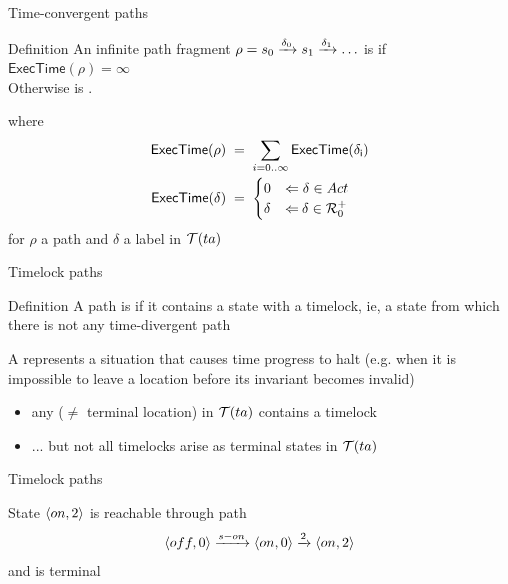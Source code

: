 \documentclass[aspectratio=169]{beamer}
\begin{document}
\def\ET#1{\mathsf{ExecTime(#1)}}
\begin{slide}{Time-convergent paths}
\small

\begin{block}{Definition}
An infinite path fragment $\rho = s_0 \xrightarrow{\delta_0} s_1 \xrightarrow{\delta_1} \ldots$ is  if $\ET{\rho} = \infty$\\
Otherwise is  . 
\end{block}

where
\begin{align*}
\ET{\rho}\; & =\; \sum_{i=0 .. \infty} \ET{\delta_i}\\
\ET{\delta}\; & =\; \begin{cases}
0 & \rimp\;  \delta \in Act\\
\delta & \rimp\:  \delta \in \R_0^+
\end{cases}
\end{align*}
for $\rho$ a path and $\delta$ a label in $\mathcal{T}(ta)$ 
\end{slide}

\begin{slide}{Timelock paths}
\small

\begin{block}{Definition}
A path is  if it contains a state with a timelock, ie, a \alert{state
from which there is not any time-divergent path}
\vspace{0.3cm}

A  represents a situation that causes time progress to halt (e.g. when it is impossible to leave a location before its invariant becomes invalid)
\end{block}

\begin{itemize}
\item any  ($\neq$ terminal location) in $\mathcal{T}(ta)$ contains a timelock
\item ... but not all timelocks arise as terminal states in $\mathcal{T}(ta)$
\end{itemize}
\end{slide}



\begin{slide}{Timelock paths}
\small

\begin{center}
\end{center}

State $\langle on,2 \rangle$ \pause is reachable through path 
$$\langle off,0 \rangle \xrightarrow{s-on} \langle on,0 \rangle \xrightarrow{2} \langle on,2 \rangle$$
and is terminal

\end{slide}
\end{document}
